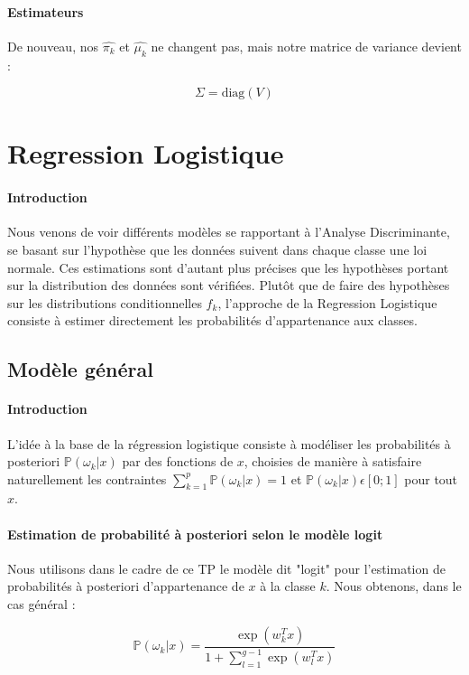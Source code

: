 \documentclass{report}
\begin{document}
\paragraph{Estimateurs}
De nouveau, nos $\hat{\pi_k}$ et $\hat{\mu_k}$ ne changent pas, mais notre matrice de variance devient :

$$ \Sigma = \text{diag}(V) $$

\section{Regression Logistique}
\paragraph{Introduction}
Nous venons de voir différents modèles se rapportant à l'Analyse Discriminante, se basant sur l'hypothèse que les données suivent dans chaque classe une loi normale. Ces estimations sont d'autant plus précises que les hypothèses portant sur la distribution des données sont vérifiées. Plutôt que de faire des hypothèses sur les distributions conditionnelles $f_k$, l'approche de la Regression Logistique consiste à estimer directement les probabilités d'appartenance aux classes.

\subsection{Modèle général}
\paragraph{Introduction}
L'idée à la base de la régression logistique consiste à modéliser les probabilités à posteriori $\mathbb{P}(\omega_k|x)$ par des fonctions de $x$, choisies de manière à satisfaire naturellement les contraintes $\sum_{k=1}^p \mathbb{P}(\omega_k|x) = 1$ et $\mathbb{P}(\omega_k|x) \epsilon [0;1]$ pour tout $x$.


\paragraph{Estimation de probabilité à posteriori selon le modèle logit}
Nous utilisons dans le cadre de ce TP le modèle dit "logit" pour l'estimation de probabilités à posteriori d'appartenance de $x$ à la classe $k$. Nous obtenons, dans le cas général :

$$\mathbb{P}(\omega_k|x) = \frac{\exp(w_k^T x)}{1 + \sum_{l=1}^{g-1} \exp (w_l^T x)}$$
\end{document}
